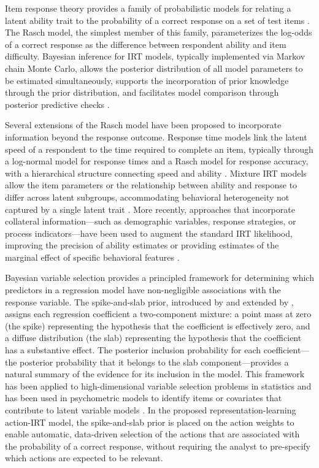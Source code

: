 \documentclass[A4paper,11pt]{article}
\begin{document}
Item response theory provides a family of probabilistic models for relating a latent ability trait to the probability of a correct response on a set of test items \citep{rasch1960probabilistic, lord1980applications, vanderLinden2016handbook}. The Rasch model, the simplest member of this family, parameterizes the log-odds of a correct response as the difference between respondent ability and item difficulty. Bayesian inference for IRT models, typically implemented via Markov chain Monte Carlo, allows the posterior distribution of all model parameters to be estimated simultaneously, supports the incorporation of prior knowledge through the prior distribution, and facilitates model comparison through posterior predictive checks \citep{patz1999straightforward}.

Several extensions of the Rasch model have been proposed to incorporate information beyond the response outcome. Response time models link the latent speed of a respondent to the time required to complete an item, typically through a log-normal model for response times and a Rasch model for response accuracy, with a hierarchical structure connecting speed and ability \citep{van2007hierarchical}. Mixture IRT models allow the item parameters or the relationship between ability and response to differ across latent subgroups, accommodating behavioral heterogeneity not captured by a single latent trait \citep{rost1990rasch}. More recently, approaches that incorporate collateral information---such as demographic variables, response strategies, or process indicators---have been used to augment the standard IRT likelihood, improving the precision of ability estimates or providing estimates of the marginal effect of specific behavioral features \citep{wang2015mixture}.

Bayesian variable selection provides a principled framework for determining which predictors in a regression model have non-negligible associations with the response variable. The spike-and-slab prior, introduced by \citet{mitchellbeauchamp1988} and extended by \citet{george1993variable}, assigns each regression coefficient a two-component mixture: a point mass at zero (the spike) representing the hypothesis that the coefficient is effectively zero, and a diffuse distribution (the slab) representing the hypothesis that the coefficient has a substantive effect. The posterior inclusion probability for each coefficient---the posterior probability that it belongs to the slab component---provides a natural summary of the evidence for its inclusion in the model. This framework has been applied to high-dimensional variable selection problems in statistics \citep{ishwaran2005spike} and has been used in psychometric models to identify items or covariates that contribute to latent variable models \citep{chen2022advantages}. In the proposed representation-learning action-IRT model, the spike-and-slab prior is placed on the action weights to enable automatic, data-driven selection of the actions that are associated with the probability of a correct response, without requiring the analyst to pre-specify which actions are expected to be relevant.
\end{document}
